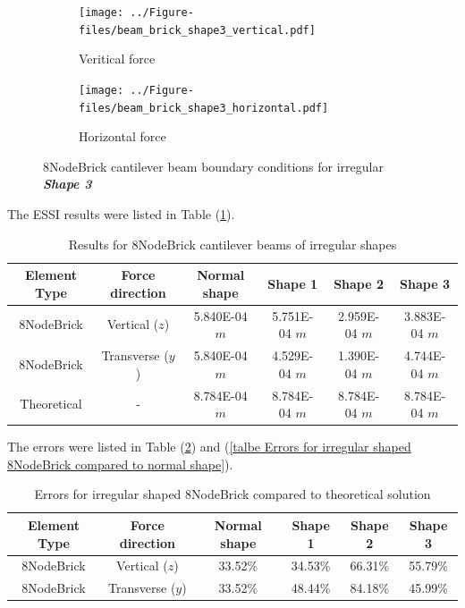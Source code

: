\documentclass[fleqn,11pt]{article}
\begin{document}
\begin{figure}[H]
  \centering
    \begin{subfigure}{0.5\textwidth}
      \centering
      \texttt{[image: ../Figure-files/beam\_brick\_shape3\_vertical.pdf]}
      \caption{Veritical force}
    \end{subfigure}
    \begin{subfigure}{0.5\textwidth}
      \centering
      \texttt{[image: ../Figure-files/beam\_brick\_shape3\_horizontal.pdf]}
      \caption{Horizontal force}
    \end{subfigure}
  \caption{8NodeBrick cantilever beam boundary conditions for irregular \textbf{\emph{Shape 3}} }
  \label{fig 8NodeBrick cantilever beam boundary conditions shape 3}
\end{figure}


The ESSI results were listed in Table (\ref{table Results for 8NodeBrick cantilever beams of irregular shapes}). 
\begin{table}[H]
  \centering
  \caption{Results for 8NodeBrick cantilever beams of irregular shapes}
  \label{table Results for 8NodeBrick cantilever beams of irregular shapes}
  \begin{tabular}{|c|c|c|c|c|c|}
    \hline 
    Element Type   & Force direction & Normal shape & Shape 1 & Shape 2 & Shape 3  \\ \hline 
    8NodeBrick     & Vertical ($z$)     & 5.840E-04 $m$  & 5.751E-04 $m$ & 2.959E-04 $m$ & 3.883E-04 $m$   \\ \hline
    8NodeBrick     & Transverse ($y$)      & 5.840E-04 $m$  & 4.529E-04 $m$ & 1.390E-04 $m$ & 4.744E-04 $m$   \\ \hline
    Theoretical    &      -              & 8.784E-04 $m$  & 8.784E-04 $m$ & 8.784E-04 $m$ & 8.784E-04 $m$ \\ \hline
  \end{tabular}
\end{table}

The errors were listed in Table (\ref{table Errors for irregular shaped 8NodeBrick compared to theoretical solution}) and (\ref{talbe Errors for irregular shaped 8NodeBrick compared to normal shape}).


\begin{table}[H]
  \centering
  \caption{Errors for irregular shaped 8NodeBrick compared to theoretical solution}
  \label{table Errors for irregular shaped 8NodeBrick compared to theoretical solution}
  \begin{tabular}{|c|c|c|c|c|c|}
    \hline 
    Element Type   & Force direction & Normal shape & Shape 1 & Shape 2 & Shape 3  \\ \hline 
    8NodeBrick     & Vertical ($z$)     & 33.52\% & 34.53\% & 66.31\% & 55.79\%  \\ \hline
    8NodeBrick     & Transverse ($y$)   & 33.52\% & 48.44\% & 84.18\% & 45.99\%  \\ \hline
  \end{tabular}
\end{table}
\end{document}
